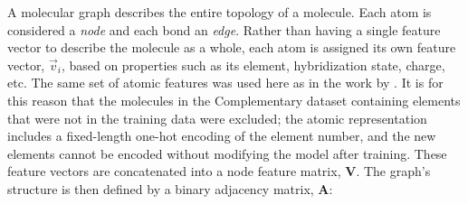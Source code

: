 




A molecular graph describes the entire topology of a molecule. Each atom is
considered a \emph{node} and each bond an \emph{edge}. Rather than having a
single feature vector to describe the molecule as a whole, each atom is assigned
its own feature vector, $\vec{v}_i$, based on properties such as its element,
hybridization state, charge, etc. The same set of atomic features was used here
as in the work by \citet{qinPredictingCriticalMicelle2021}. It is for this
reason that the molecules in the Complementary dataset containing elements that
were not in the training data were excluded; the atomic representation includes
a fixed-length one-hot encoding of the element number, and the new elements
cannot be encoded without modifying the model after training. These feature
vectors are concatenated into a node feature matrix, $\mathbf{V}$. The graph's
structure is then defined by a binary adjacency matrix, $\mathbf{A}$:

